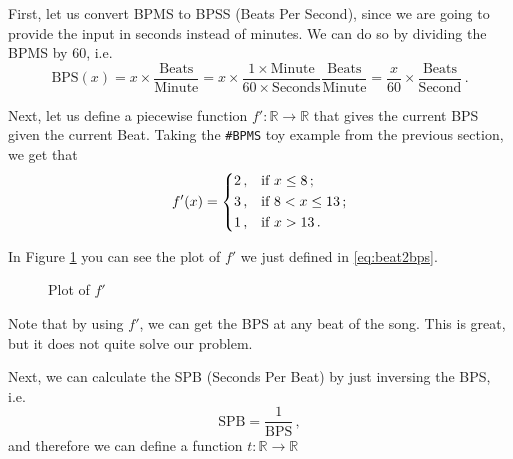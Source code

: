 \documentclass[a4paper,9pt]{article}
\begin{document}
    First, let us convert BPMS to BPSS (Beats Per Second), since we are going to provide the input in seconds instead of minutes. We can do so by dividing the BPMS by 60, i.e.
    \begin{equation}
	    \text{BPS}(x) = x \times \frac{\text{Beats}}{\text{Minute}} = x \times \frac{1 \times \text{Minute}}{60 \times \text{Seconds}} \frac{\text{Beats}}{\text{Minute}} = \frac{x}{60} \times \frac{\text{Beats}}{\text{Second}}\,. 
	    \label{eq:bpm2bps}
    \end{equation}

    Next, let us define a piecewise function $f': \mathbb{R} \rightarrow \mathbb{R}$ that gives the current BPS given the current Beat. Taking the \texttt{\#BPMS} toy example from the previous section, we get that
    \begin{equation}
	    f'(x) = \begin{dcases}
		    2\,, & \text{if $x \leq 8\,;$}\\ 
		    3\,, & \text{if $8 < x \leq 13\,;$}\\ 
		    1\,, & \text{if $x > 13\,.$}\\ 
	    \end{dcases}
	    \label{eq:beat2bps}
    \end{equation}

    In Figure \ref{fig:beat2bps} you can see the plot of $f'$ we just defined in \eqref{eq:beat2bps}. 

\begin{figure}[htpb]
	\centering



	\caption{Plot of $f'$}
	\label{fig:beat2bps}
\end{figure}

Note that by using $f'$, we can get the BPS at any beat of the song. This is great, but it does not quite solve our problem. 

Next, we can calculate the SPB (Seconds Per Beat) by just inversing the BPS, i.e.
\begin{equation}
	\text{SPB} = \frac{1}{\text{BPS}}\,,
	\label{eq:bps2spb}
\end{equation}
and therefore we can define a function $t: \mathbb{R} \rightarrow \mathbb{R}$
\end{document}
